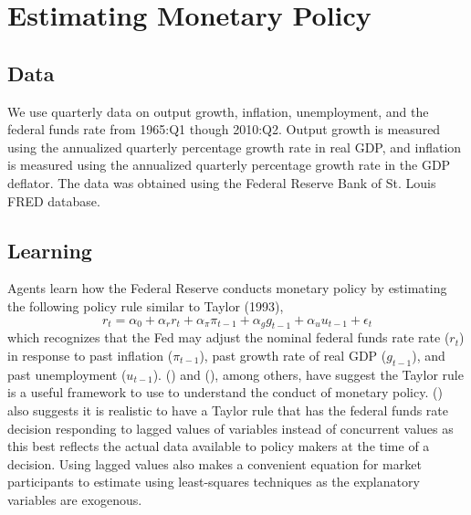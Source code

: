 \documentclass[12pt]{article}
\newcommand{\beq}{\begin{equation}}
\newcommand{\eeq}{\end{equation}}
\newcommand{\citee}[1]{\citename{#1} (\citeyear{#1})}
\begin{document}
\section{Estimating Monetary Policy}
\subsection{Data}
We use quarterly data on output growth, inflation, unemployment, and the federal funds rate from 1965:Q1 though 2010:Q2.  Output growth is measured using the annualized quarterly percentage growth rate in real GDP, and inflation is measured using the annualized quarterly percentage growth rate in the GDP deflator.  The data was obtained using the Federal Reserve Bank of St. Louis FRED database.

\subsection{Learning}
Agents learn how the Federal Reserve conducts monetary policy by estimating the following policy rule similar to Taylor (1993),
\beq \label{eq:taylor} r_t = \alpha_0 + \alpha_r r_t + \alpha_{\pi} \pi_{t-1} + \alpha_g g_{t-1} + \alpha_u u_{t-1} + \epsilon_t \eeq
which recognizes that the Fed may adjust the nominal federal funds rate rate ($r_t$) in response to past inflation ($\pi_{t-1}$), past growth rate of real GDP ($g_{t-1}$), and past unemployment ($u_{t-1}$).  \citee{taylor1999} and \citee{orphanides2003}, among others, have suggest the Taylor rule is a useful framework to use to understand the conduct of monetary policy.  \citee{mccallum1997} also suggests it is realistic to have a Taylor rule that has the federal funds rate decision responding to lagged values of variables instead of concurrent values as this best reflects the actual data available to policy makers at the time of a decision.  Using lagged values also makes a convenient equation for market participants to estimate using least-squares techniques as the explanatory variables are exogenous.  
\end{document}
